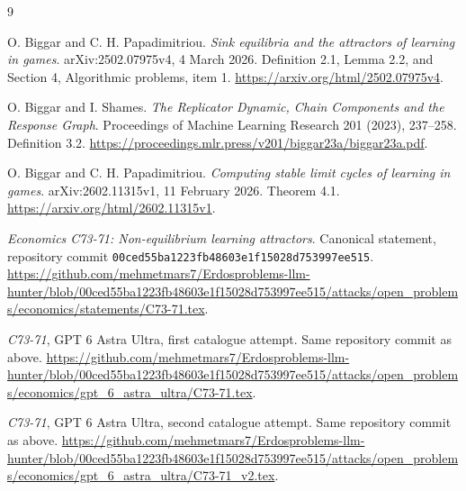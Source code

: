 \documentclass[11pt,a4paper]{article}
\numberwithin{equation}{section}
\theoremstyle{definition}
\begin{document}
\begin{thebibliography}{9}\raggedright
{} O. Biggar and C. H. Papadimitriou.
\emph{Sink equilibria and the attractors of learning in games}.
arXiv:2502.07975v4, 4 March 2026.
Definition 2.1, Lemma 2.2, and Section 4, Algorithmic problems, item 1.
\url{https://arxiv.org/html/2502.07975v4}.

 O. Biggar and I. Shames.
\emph{The Replicator Dynamic, Chain Components and the Response Graph}.
Proceedings of Machine Learning Research 201 (2023), 237--258.
Definition 3.2.
\url{https://proceedings.mlr.press/v201/biggar23a/biggar23a.pdf}.

 O. Biggar and C. H. Papadimitriou.
\emph{Computing stable limit cycles of learning in games}.
arXiv:2602.11315v1, 11 February 2026. Theorem 4.1.
\url{https://arxiv.org/html/2602.11315v1}.

 \emph{Economics C73-71: Non-equilibrium learning
attractors}. Canonical statement, repository commit
\texttt{00ced55ba1223fb48603e1f15028d753997ee515}.
\url{https://github.com/mehmetmars7/Erdosproblems-llm-hunter/blob/00ced55ba1223fb48603e1f15028d753997ee515/attacks/open_problems/economics/statements/C73-71.tex}.

 \emph{C73-71}, GPT 6 Astra Ultra, first catalogue attempt.
Same repository commit as above.
\url{https://github.com/mehmetmars7/Erdosproblems-llm-hunter/blob/00ced55ba1223fb48603e1f15028d753997ee515/attacks/open_problems/economics/gpt_6_astra_ultra/C73-71.tex}.

 \emph{C73-71}, GPT 6 Astra Ultra, second catalogue attempt.
Same repository commit as above.
\url{https://github.com/mehmetmars7/Erdosproblems-llm-hunter/blob/00ced55ba1223fb48603e1f15028d753997ee515/attacks/open_problems/economics/gpt_6_astra_ultra/C73-71_v2.tex}.
\end{thebibliography}
\end{document}
